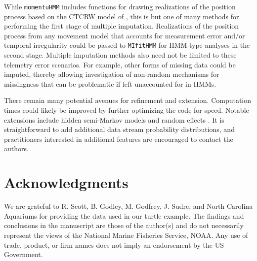\documentclass[12pt]{article}\usepackage[]{graphicx}\usepackage[]{color}
\begin{document}
While \verb|momentuHMM| includes functions for drawing realizations of the position process based on the CTCRW model of \cite{JohnsonEtAl2008}, this is but one of many methods for performing the first stage of multiple imputation. Realizations of the position process from any movement model that accounts for measurement error and/or temporal irregularity \citep[e.g.][]{CalabreseEtAl2016} could be passed to \verb|MIfitHMM| for HMM-type analyses in the second stage. Multiple imputation methods also need not be limited to these telemetry error scenarios. For example, other forms of missing data could be imputed, thereby allowing investigation of non-random mechanisms for missingness that can be problematic if left unaccounted for in HMMs.

There remain many potential avenues for refinement and extension. Computation times could likely be improved by further optimizing the code for speed. Notable extensions include hidden semi-Markov models and random effects %
\citep{ZucchiniEtAl2016}. %
It is straightforward to add additional data stream probability distributions, and practitioners interested in additional features are encouraged to contact the authors.

\section*{Acknowledgments}
\noindent We are grateful to R. Scott, B. Godley, M. Godfrey, J. Sudre, and North Carolina Aquariums for providing the data used in our turtle example. The findings and conclusions in the manuscript are those of the author(s) and do not necessarily represent the views of the National Marine Fisheries Service, NOAA. Any use of trade, product, or firm names does not imply an endorsement by the US Government.




\clearpage
\end{document}
